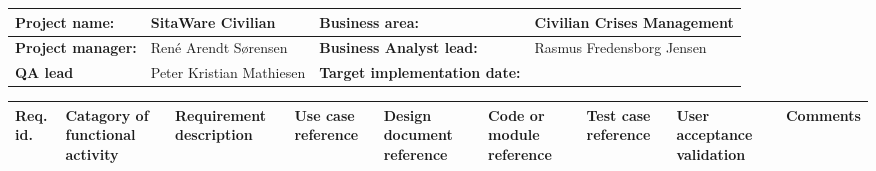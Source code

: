 \begin{sidewaystable}
\begin{table}[H]
\begin{tabular}{|l|l|l|l|}
\hline
 \textbf{Project name:} & SitaWare Civilian & \textbf{Business area:}  & Civilian Crises Management\\ \hline
 \textbf{Project manager:} & René Arendt Sørensen & \textbf{Business Analyst lead:} & Rasmus Fredensborg  Jensen\\ \hline
 \textbf{QA lead} & Peter Kristian Mathiesen & \textbf{Target implementation date:}  & \\ \hline
\end{tabular}	
\begin{tabular}{|p{2cm}|p{2cm}|p{3cm}|p{2cm}|p{2cm}|p{2cm}|p{2cm}|p{2cm}|p{2cm}|}
\hline
 Req. id. & Catagory of functional activity & Requirement description  & Use case reference & Design document reference & Code or module reference & Test case reference & User acceptance validation & Comments\\ \hline


\end{tabular}
\end{table}
\end{sidewaystable}

